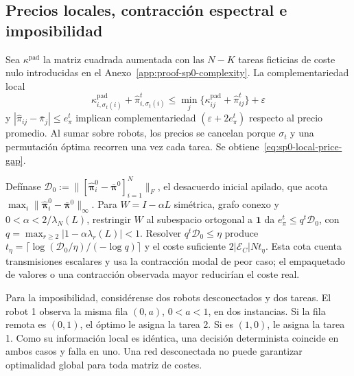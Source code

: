 \subsection{Precios locales, contracción espectral e imposibilidad}
\label{app:proof-sp0-local-prices}

Sea $\kappa^{\mathrm{pad}}$ la matriz cuadrada aumentada con las $N-K$ tareas ficticias de coste nulo introducidas en el Anexo~\ref{app:proof-sp0-complexity}. La complementariedad local
\[
 \kappa^{\mathrm{pad}}_{i,\sigma_t(i)}+\widehat\pi^t_{i,\sigma_t(i)}
 \leq\min_j\{\kappa^{\mathrm{pad}}_{ij}+\widehat\pi^t_{ij}\}+\varepsilon
\]
y $|\widehat\pi_{ij}-\bar\pi_j|\leq e_\pi^t$ implican complementariedad $(\varepsilon+2e_\pi^t)$ respecto al precio promedio. Al sumar sobre robots, los precios se cancelan porque $\sigma_t$ y una permutación óptima recorren una vez cada tarea. Se obtiene~\eqref{eq:sp0-local-price-gap}.

Defínase $\mathcal D_0:=\lVert[\widehat{\boldsymbol\pi}_i^0-\bar{\boldsymbol\pi}^0]_{i=1}^N\rVert_F$, el desacuerdo inicial apilado, que acota $\max_i\lVert\widehat{\boldsymbol\pi}_i^0-\bar{\boldsymbol\pi}^0\rVert_\infty$. Para $W=I-\alpha L$ simétrica, grafo conexo y $0<\alpha<2/\lambda_N(L)$, restringir $W$ al subespacio ortogonal a $\mathbf1$ da $e_\pi^t\leq q^t\mathcal D_0$, con $q=\max_{r\geq2}|1-\alpha\lambda_r(L)|<1$. Resolver $q^t\mathcal D_0\leq\eta$ produce $t_\eta=\lceil\log(\mathcal D_0/\eta)/(-\log q)\rceil$ y el coste suficiente $2|\mathcal E_C|Nt_\eta$. Esta cota cuenta transmisiones escalares y usa la contracción modal de peor caso; el empaquetado de valores o una contracción observada mayor reducirían el coste real.

Para la imposibilidad, considérense dos robots desconectados y dos tareas. El robot 1 observa la misma fila $(0,a)$, $0<a<1$, en dos instancias. Si la fila remota es $(0, 1)$, el óptimo le asigna la tarea 2. Si es $(1, 0)$, le asigna la tarea 1. Como su información local es idéntica, una decisión determinista coincide en ambos casos y falla en uno. Una red desconectada no puede garantizar optimalidad global para toda matriz de costes.
